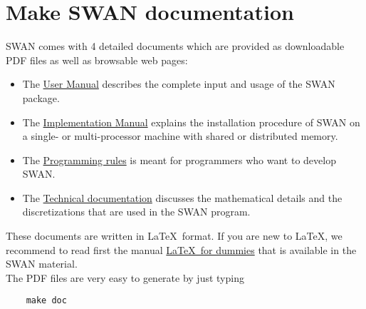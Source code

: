 \documentclass[12pt]{book}
\begin{document}
\newpage
\section{Make SWAN documentation} \label{sec:makedoc}

SWAN comes with 4 detailed documents which are provided as downloadable PDF files as well as browsable web pages:
\begin{itemize}
  \item The \underline{User Manual} describes the complete input and usage of the SWAN package.
  \item The \underline{Implementation Manual} explains the installation procedure of SWAN on a single- or multi-processor machine
        with shared or distributed memory.
  \item The \underline{Programming rules} is meant for programmers who want to develop SWAN.
  \item The \underline{Technical documentation} discusses the mathematical details and the discretizations that are used in the SWAN program.
\end{itemize}
These documents are written in \LaTeX~format. If you are new to \LaTeX, we recommend to read first the manual \underline{\LaTeX~for dummies}
that is available in the SWAN material.
\\[2ex]
\noindent
The PDF files are very easy to generate by just typing
\begin{verbatim}
    make doc
\end{verbatim}

 \label{ch:usechan}
\end{document}
